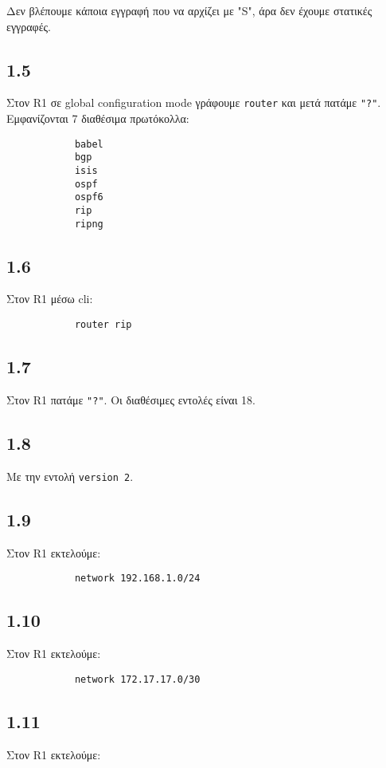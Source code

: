 \documentclass[a4paper, 12pt]{article}
\begin{document}
		Δεν βλέπουμε κάποια εγγραφή που να αρχίζει με "S", άρα δεν έχουμε στατικές εγγραφές.

	\subsection*{1.5}
		Στον R1 σε global configuration mode γράφουμε \verb|router| και μετά πατάμε \verb|"?"|. Εμφανίζονται 7 διαθέσιμα πρωτόκολλα:
		
		\begin{verbatim}
			babel 
			bgp
			isis
			ospf
			ospf6
			rip
			ripng
		\end{verbatim} 

	\subsection*{1.6}
		Στον R1 μέσω cli:
		
		\begin{verbatim}
			router rip
		\end{verbatim}

	\subsection*{1.7}
		Στον R1 πατάμε \verb|"?"|. Οι διαθέσιμες εντολές είναι 18.

	\subsection*{1.8}
		Με την εντολή \verb|version 2|.

	\subsection*{1.9}
		Στον R1 εκτελούμε:
		
		\begin{verbatim}
			network 192.168.1.0/24
		\end{verbatim}

	\subsection*{1.10}
		Στον R1 εκτελούμε:
		
		\begin{verbatim}
			network 172.17.17.0/30
		\end{verbatim}

	\subsection*{1.11}
		Στον R1 εκτελούμε:
		
\end{document}
